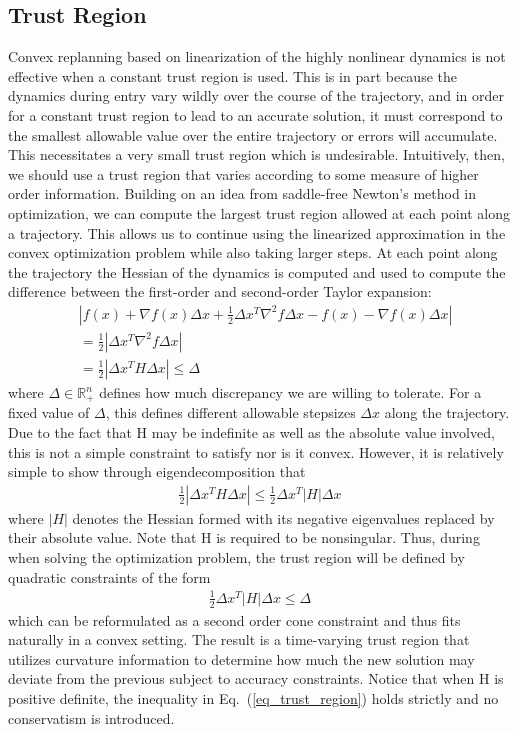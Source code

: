 \documentclass[10pt,a4paper]{article}
\begin{document}
	\subsection{Trust Region}
	Convex replanning based on linearization of the highly nonlinear dynamics is not effective when a constant trust region is used. This is in part because the dynamics during entry vary wildly over the course of the trajectory, and in order for a constant trust region to lead to an accurate solution, it must correspond to the smallest allowable value over the entire trajectory or errors will accumulate. This necessitates a very small trust region which is undesirable. Intuitively, then, we should use a trust region that varies according to some measure of higher order information. Building on an idea from saddle-free Newton's method in optimization, we can compute the largest trust region allowed at each point along a trajectory. This allows us to continue using the linearized approximation in the convex optimization problem while also taking larger steps. At each point along the trajectory the Hessian of the dynamics is computed and used to compute the difference between the first-order and second-order Taylor expansion:
	\begin{align}
	&|f(x) + \nabla f(x)\Delta x + \frac{1}{2}\Delta x^T \nabla^2f\Delta x - f(x) - \nabla f(x)\Delta x |\\
	&= \frac{1}{2}|\Delta x^T \nabla^2f\Delta x| \\
	&= \frac{1}{2}|\Delta x^T H\Delta x| \le \Delta
	\end{align}
	where $\Delta\in\mathbb{R}^n_+$ defines how much discrepancy we are willing to tolerate. For a fixed value of $\Delta$, this defines different allowable stepsizes $\Delta x$ along the trajectory. Due to the fact that H may be indefinite as well as the absolute value involved, this is not a simple constraint to satisfy nor is it convex. However, it is relatively simple to show through eigendecomposition that 
	\begin{align}
	\frac{1}{2}|\Delta x^T H\Delta x| \le \frac{1}{2}\Delta x^T |H|\Delta x
	\end{align}
	where $ |H| $ denotes the Hessian formed with its negative eigenvalues replaced by their absolute value. Note that H is required to be nonsingular. Thus, during when solving the optimization problem, the trust region will be defined by quadratic constraints of the form
	\begin{align}
	\frac{1}{2}\Delta x^T |H|\Delta x \le \Delta \label{eq_trust_region}
	\end{align}
	which can be reformulated as a second order cone constraint and thus fits naturally in a convex setting. The result is a time-varying trust region that utilizes curvature information to determine how much the new solution may deviate from the previous subject to accuracy constraints. Notice that when H is positive definite, the inequality in Eq.~(\ref{eq_trust_region}) holds strictly and no conservatism is introduced. 
\end{document}
